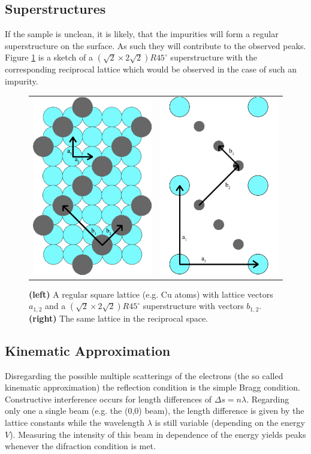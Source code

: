 \documentclass[a4paper]{scrartcl}
\numberwithin{equation}{section}
\numberwithin{figure}{section}
\numberwithin{table}{section}
\begin{document}
\subsection{Superstructures}
If the sample is unclean, it is likely, that the impurities will form a regular superstructure on the surface. As such they will contribute to the observed peaks. Figure \ref{fig:superstructure} is a sketch of a $(\sqrt{2} \times 2\sqrt{2})R45^\circ$ superstructure with the corresponding reciprocal lattice which would be observed in the case of such an impurity.
\begin{figure}[!bthp]
        \begin{center}
        \begin{tabular}{l r}
        		\includegraphics[width=0.2\linewidth]{pic/superstructure.pdf}
       	&
       		\includegraphics[width=0.2\linewidth]{pic/superstructure2.pdf}
		  \end{tabular}
        \end{center}
        \caption{
			\small \textbf{(left)} A regular square lattice (e.g. Cu atoms) with lattice vectors $a_{1,2}$ and a  $(\sqrt{2} \times 2\sqrt{2})R45^\circ$ superstructure with vectors $b_{1,2}$.
			\textbf{(right)} The same lattice in the reciprocal space.
        }
        \label{fig:superstructure}
\end{figure}


\subsection{Kinematic Approximation}
Disregarding the possible multiple scatterings of the electrons (the so called kinematic approximation) the reflection condition is the simple Bragg condition. Constructive interference occurs for length differences of $\Delta s = n\lambda$. Regarding only one a single beam (e.g. the (0,0) beam), the length difference is given by the lattice constants while the wavelength $\lambda$ is still variable (depending on the energy $V$). Measuring the intensity of this beam in dependence of the energy yields peaks whenever the difraction condition is met.
\end{document}
